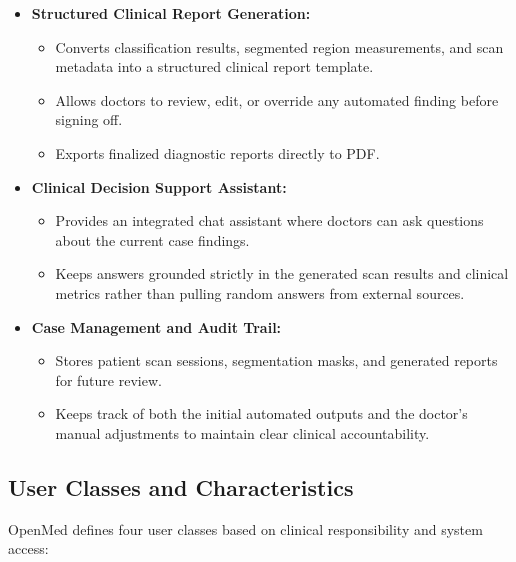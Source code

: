 \documentclass[12pt,a4paper]{report}
\begin{document}
\begin{itemize}[leftmargin=1.2em]
\begin{itemize}[leftmargin=1.2em]
        \item Provides full camera controls including rotation, zoom, pan, and layer opacity adjustment.
    \end{itemize}
    \item \textbf{Structured Clinical Report Generation:}
    \begin{itemize}[leftmargin=1.2em]
        \item Converts classification results, segmented region measurements, and scan metadata into a structured clinical report template.
        \item Allows doctors to review, edit, or override any automated finding before signing off.
        \item Exports finalized diagnostic reports directly to PDF.
    \end{itemize}
    \item \textbf{Clinical Decision Support Assistant:}
    \begin{itemize}[leftmargin=1.2em]
        \item Provides an integrated chat assistant where doctors can ask questions about the current case findings.
        \item Keeps answers grounded strictly in the generated scan results and clinical metrics rather than pulling random answers from external sources.
    \end{itemize}
    \item \textbf{Case Management and Audit Trail:}
    \begin{itemize}[leftmargin=1.2em]
        \item Stores patient scan sessions, segmentation masks, and generated reports for future review.
        \item Keeps track of both the initial automated outputs and the doctor's manual adjustments to maintain clear clinical accountability.
    \end{itemize}
\end{itemize}

\subsection{User Classes and Characteristics}
OpenMed defines four user classes based on clinical responsibility and system access:
\end{document}
